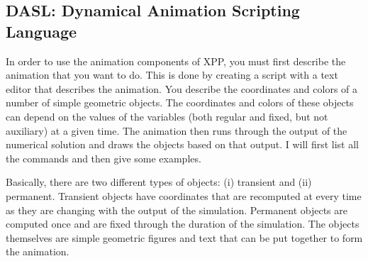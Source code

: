 \documentclass{article}
\begin{document}
\subsection{ DASL: Dynamical Animation Scripting Language}
In order to use the animation components of XPP, you must first
describe the animation that you want to do. This is done by creating a
script with a text editor that describes the animation. You describe
the coordinates and colors of a number of simple geometric
objects. The coordinates and colors of these objects can depend on the
values of the variables (both regular and fixed, but not auxiliary) at
a given time. The animation then runs through the output of the
numerical solution and draws the objects based on that output. I will
first list all the commands and then give some examples.

Basically,
there are two different types of objects: (i) transient and (ii)
permanent. Transient objects have coordinates that are recomputed at
every time as they are changing with the output of the
simulation. Permanent objects are computed once and are fixed through
the duration of the simulation. The objects themselves are simple
geometric figures and text that can be put together to form the
animation.
\end{document}

